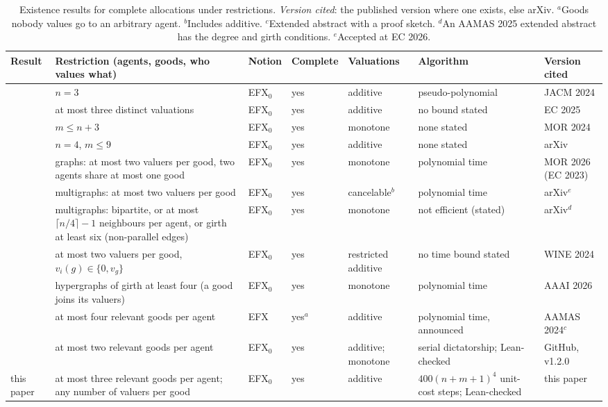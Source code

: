 \documentclass[runningheads,11pt]{llncs}
\newcommand{\efxz}{\texorpdfstring{\mbox{EFX$_0$}}{EFX0}}
\begin{document}
\begin{table}[tbp]
\caption{Existence results for complete allocations under restrictions. \emph{Version cited}: the published version where one exists, else arXiv. $^a$Goods nobody values go to an arbitrary agent. $^b$Includes additive. $^c$Extended abstract with a proof sketch. $^d$An AAMAS 2025 extended abstract has the degree and girth conditions. $^e$Accepted at EC 2026.}\label{tab:rw}
\centering\footnotesize
\setlength{\tabcolsep}{3pt}\begin{tabular}{@{}>{\raggedright\arraybackslash}p{}>{\raggedright\arraybackslash}p{}>{\raggedright\arraybackslash}p{}>{\raggedright\arraybackslash}p{}>{\raggedright\arraybackslash}p{}>{\raggedright\arraybackslash}p{}>{\raggedright\arraybackslash}p{}@{}}
\toprule
Result & Restriction (agents, goods, who values what) & Notion & Complete & Valuations & Algorithm & Version cited \\
\midrule
\cite{ChaudhuryGM20} & $n=3$ & \efxz{} & yes & additive & pseudo-polynomial & JACM 2024 \\
\cite{HVGNV25} & at most three distinct valuations & \efxz{} & yes & additive & no bound stated & EC 2025 \\
\cite{Mahara21} & $m\le n+3$ & \efxz{} & yes & monotone & none stated & MOR 2024 \\
\cite{AlkassarFM26} & $n=4$, $m\le9$ & \efxz{} & yes & additive & none stated & arXiv \\
\cite{ChristodoulouFKS23} & graphs: at most two valuers per good, two agents share at most one good & \efxz{} & yes & monotone & polynomial time & MOR 2026 (EC 2023) \\
\cite{AfshinmehrAMMS26} & multigraphs: at most two valuers per good & \efxz{} & yes & cancelable$^b$ & polynomial time & arXiv$^e$ \\
\cite{SgouritsaS25} & multigraphs: bipartite, or at most $\lceil n/4\rceil-1$ neighbours per agent, or girth at least six (non-parallel edges) & \efxz{} & yes & monotone & not efficient (stated) & arXiv$^d$ \\
\cite{KavianiSS24} & at most two valuers per good, $v_i(g)\in\{0,v_g\}$ & \efxz{} & yes & restricted additive & no time bound stated & WINE 2024 \\
\cite{LianeasSS26} & hypergraphs of girth at least four (a good joins its valuers) & \efxz{} & yes & monotone & polynomial time & AAAI 2026 \\
\cite{ViswanathanM24} & at most four relevant goods per agent & EFX & yes$^a$ & additive & polynomial time, announced & AAMAS 2024$^c$ \\
\cite{MrdEfx} & at most two relevant goods per agent & \efxz{} & yes & additive; monotone & serial dictatorship; Lean-checked & GitHub, v1.2.0 \\
this paper & at most three relevant goods per agent; any number of valuers per good & \efxz{} & yes & additive & $400(n+m+1)^4$ unit-cost steps; Lean-checked & this paper \\
\bottomrule
\end{tabular}
\end{table}
\end{document}
